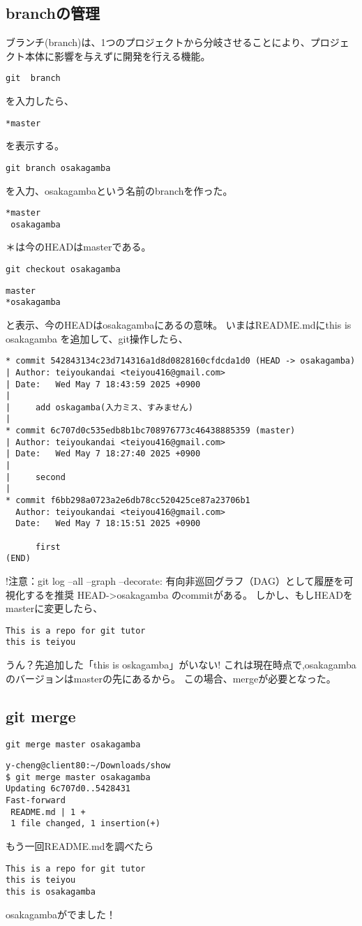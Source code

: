 \documentclass{article}
\begin{document}
\subsection{branchの管理}
ブランチ(branch)は、1つのプロジェクトから分岐させることにより、プロジェクト本体に影響を与えずに開発を行える機能。
\begin{lstlisting}
git  branch 
\end{lstlisting}
を入力したら、
\begin{lstlisting}
*master
\end{lstlisting}
を表示する。
\begin{lstlisting}
git branch osakagamba
\end{lstlisting}
を入力、osakagambaという名前のbranchを作った。
\begin{lstlisting}
*master
 osakagamba
\end{lstlisting}
＊は今のHEADはmasterである。
\begin{lstlisting}
git checkout osakagamba
\end{lstlisting}
\begin{lstlisting}
master
*osakagamba
\end{lstlisting}
と表示、今のHEADはosakagambaにあるの意味。
いまはREADME.mdにthis is osakagamba を追加して、git操作したら、
\begin{lstlisting}
* commit 542843134c23d714316a1d8d0828160cfdcda1d0 (HEAD -> osakagamba)
| Author: teiyoukandai <teiyou416@gmail.com>
| Date:   Wed May 7 18:43:59 2025 +0900
| 
|     add oskagamba(入力ミス、すみません)
| 
* commit 6c707d0c535edb8b1bc708976773c46438885359 (master)
| Author: teiyoukandai <teiyou416@gmail.com>
| Date:   Wed May 7 18:27:40 2025 +0900
| 
|     second
| 
* commit f6bb298a0723a2e6db78cc520425ce87a23706b1
  Author: teiyoukandai <teiyou416@gmail.com>
  Date:   Wed May 7 18:15:51 2025 +0900
  
      first
(END)
\end{lstlisting}
!注意：git log --all --graph --decorate: 有向非巡回グラフ（DAG）として履歴を可視化するを推奨
HEAD->osakagamba のcommitがある。
しかし、もしHEADをmasterに変更したら、
\begin{lstlisting}
This is a repo for git tutor
this is teiyou
\end{lstlisting}
うん？先追加した「this is oskagamba」がいない!
これは現在時点で,osakagambaのバージョンはmasterの先にあるから。
この場合、mergeが必要となった。
\subsection{git merge}
\begin{lstlisting}
git merge master osakagamba
\end{lstlisting}
\begin{lstlisting}
y-cheng@client80:~/Downloads/show  
$ git merge master osakagamba
Updating 6c707d0..5428431
Fast-forward
 README.md | 1 +
 1 file changed, 1 insertion(+)
\end{lstlisting}
もう一回README.mdを調べたら
\begin{lstlisting}
This is a repo for git tutor
this is teiyou
this is osakagamba
\end{lstlisting}
osakagambaがでました！
\end{document}
